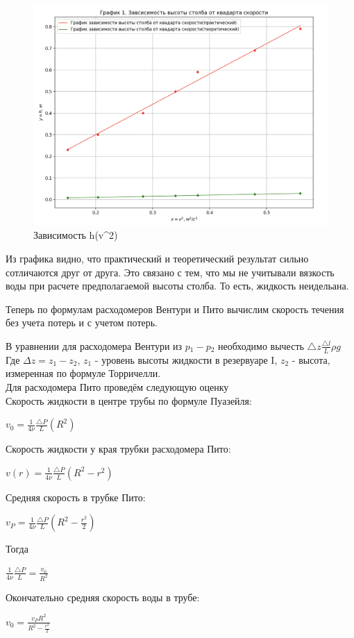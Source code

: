 \documentclass[a4paper,12pt]{article} %
\begin{document}
\begin{figure}[h!]
	\begin{center}
		\includegraphics[width=18cm]{Snimok_Ekrana_2023-06-11_V_16_55_59.png}
	\end{center}
	\caption{Зависимость h(v^2)}
	\label{ust}
\end{figure}

Из графика видно, что практический и теоретический результат сильно сотличаются друг от друга. Это связано с тем, что мы не учитывали вязкость воды при расчете предполагаемой высоты столба. То есть, жидкость неидельана.

Теперь по формулам расходомеров Вентури и Пито вычислим скорость течения без учета потерь и с учетом потерь. 

В уравнении для расходомера Вентури из
$p{}_1{} - p{}_2{}$ необходимо вычесть $\triangle z\frac {\triangle l}{L}\rho g$\\
Где $\Delta z = z_{1} - z_{2}$, $z_{1}$ - уровень высоты жидкости в резервуаре I, $z_{2}$ - высота, измеренная по формуле Торричелли.\\ 
Для расходомера Пито проведём следующую оценку\\
Скорость жидкости в центре трубы по формуле Пуазейля:
\begin{center}
$v_0 =\frac{1}{4\nu}\frac{\triangle P}{L}(R^2)$
\end{center}
Скорость жидкости у края трубки расходомера Пито:\\
\begin{center}
$v(r) =\frac{1}{4\nu}\frac{\triangle P}{L}(R^2-r^2)$
\end{center}
Средняя скорость в трубке Пито:\\
\begin{center}
$v_P =\frac{1}{4\nu}\frac{\triangle P}{L}(R^2-\frac{r^2}{2})$
\end{center}
Тогда\\
\begin{center}
$\frac{1}{4\nu}\frac{\triangle P}{L} =\frac{v_0}{R^2}$
\end{center}
Окончательно средняя скорость воды в трубе:\\
\begin{center}
$v_0 =\frac{v_P R^2}{R^2-\frac{r^2}{2}}$
\end{center}
\end{document}
